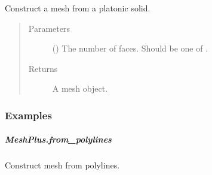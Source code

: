 \documentclass[letterpaper,10pt,english]{sphinxmanual}
\begin{document}
\begin{fulllineitems}
\begin{fulllineitems}
\label{\detokenize{api/generated/directional_clustering.mesh.MeshPlus.from_polyhedron:directional_clustering.mesh.MeshPlus.from_polyhedron}}
Construct a mesh from a platonic solid.
\begin{quote}\begin{description}
\item[{Parameters}] \leavevmode
{} () \textendash{} The number of faces.
Should be one of .

\item[{Returns}] \leavevmode
{} \textendash{} A mesh object.

\end{description}\end{quote}
\subsubsection*{Examples}

\begin{sphinxVerbatim}[commandchars=\\\{\}]
\end{sphinxVerbatim}

\end{fulllineitems}



\subparagraph{MeshPlus.from\_polylines}
\label{\detokenize{api/generated/directional_clustering.mesh.MeshPlus.from_polylines:meshplus-from-polylines}}\label{\detokenize{api/generated/directional_clustering.mesh.MeshPlus.from_polylines::doc}}

\begin{fulllineitems}
\label{\detokenize{api/generated/directional_clustering.mesh.MeshPlus.from_polylines:directional_clustering.mesh.MeshPlus.from_polylines}}
Construct mesh from polylines.


\end{fulllineitems}
\end{fulllineitems}
\end{document}
